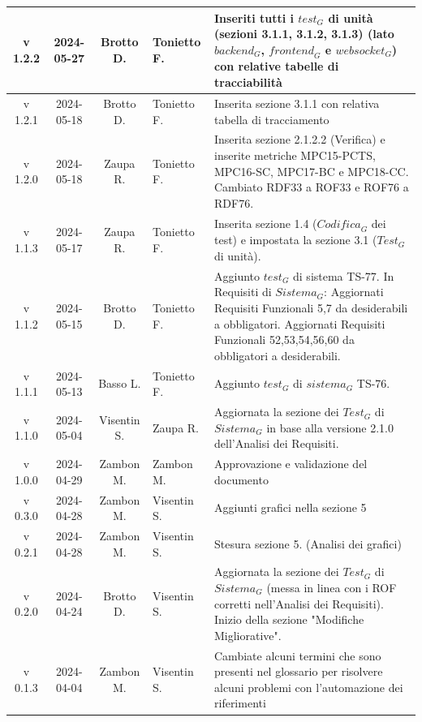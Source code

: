 \documentclass[12pt, oneside]{article}
\begin{document}
\begin{longtable}{|c|c|c|p{3cm}|p{6cm}|}
v 1.2.2 & 2024-05-27 & Brotto D. & Tonietto F. & Inseriti tutti i $\textit{test}_G$ di unità (sezioni 3.1.1, 3.1.2, 3.1.3) (lato $\textit{backend}_G$, $\textit{frontend}_G$ e $\textit{websocket}_G$) con relative tabelle di tracciabilità \\
\hline
v 1.2.1 & 2024-05-18 & Brotto D. & Tonietto F. & Inserita sezione 3.1.1  con relativa tabella di tracciamento \\
\hline
v 1.2.0 & 2024-05-18 & Zaupa R. & Tonietto F. & Inserita sezione 2.1.2.2 (Verifica) e inserite metriche MPC15-PCTS, MPC16-SC, MPC17-BC e MPC18-CC. Cambiato RDF33 a ROF33 e ROF76 a RDF76.\\
\hline
v 1.1.3 & 2024-05-17 & Zaupa R. & Tonietto F. & Inserita sezione 1.4 ($\textit{Codifica}_G$ dei test) e impostata la sezione 3.1 ($\textit{Test}_G$ di unità). \\
\hline
v 1.1.2 & 2024-05-15 & Brotto D. & Tonietto F. & Aggiunto $\textit{test}_G$ di sistema TS-77. \newline In Requisiti di $\textit{Sistema}_G$: \newline Aggiornati Requisiti Funzionali 5,7 da desiderabili a obbligatori. \newline Aggiornati Requisiti Funzionali 52,53,54,56,60 da obbligatori a desiderabili.\\
\hline
v 1.1.1 & 2024-05-13 & Basso L. & Tonietto F. & Aggiunto $\textit{test}_G$ di $\textit{sistema}_G$ TS-76.\\
\hline
v 1.1.0 & 2024-05-04 & Visentin S. & Zaupa R. & Aggiornata la sezione dei $\textit{Test}_G$ di $\textit{Sistema}_G$ in base alla versione 2.1.0 dell'Analisi dei Requisiti.\\
\hline
v 1.0.0 & 2024-04-29 & Zambon M. & Zambon M. & Approvazione e validazione del documento\\
\hline
v 0.3.0 & 2024-04-28 & Zambon M. & Visentin S. & Aggiunti grafici nella sezione 5\\
\hline
v 0.2.1 & 2024-04-28 & Zambon M. & Visentin S. & Stesura sezione 5. (Analisi dei grafici)\\
\hline
v 0.2.0 & 2024-04-24 & Brotto D. & Visentin S. & Aggiornata la sezione dei $\textit{Test}_G$ di $\textit{Sistema}_G$ (messa in linea con i ROF corretti nell'Analisi dei Requisiti).
\newline
Inizio della sezione "Modifiche Migliorative".\\
\hline
v 0.1.3 & 2024-04-04 & Zambon M. & Visentin S. & Cambiate alcuni termini che sono presenti nel glossario per risolvere alcuni problemi con l'automazione dei riferimenti\\

\end{longtable}
\end{document}
